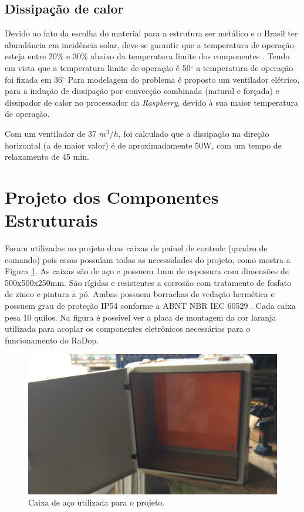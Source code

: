 \subsection{Dissipação de calor}

Devido ao fato da escolha do material para a estrutura ser metálico e o Brasil ter abundância em incidência solar, deve-se garantir que a temperatura de operação esteja entre 20\% e 30\% abaixo da temperatura limite dos componentes \cite{dissipacao}. Tendo em vista que a temperatura limite de operação é 50$^{\circ}$ a temperatura de operação foi fixada em 36$^{\circ}$ Para modelagem do problema é proposto um ventilador elétrico, para a indução de dissipação por convecção combinada (natural e forçada) \cite{transcal} e dissipador de calor no processador da \textit{Raspberry}, devido à sua maior temperatura de operação.

Com um ventilador de 37 $m^3/h$, foi calculado que a dissipação na direção horizontal (a de maior valor) é de aproximadamente 50W, com um tempo de relaxamento de 45 min.

\section{Projeto dos Componentes Estruturais}

Foram utilizadas no projeto duas caixas de painel de controle (quadro de comando) pois essas possuíam todas as necessidades do projeto, como mostra a Figura \ref{caixa}. As caixas são de aço e possuem 1mm de espessura com dimensões de 500x500x250mm. São rígidas e resistentes a corrosão com tratamento de fosfato de zinco e pintura a pó. Ambas possuem borrachas de vedação hermética e possuem grau de proteção IP54 conforme a ABNT NBR IEC 60529 \cite{involucro}. Cada caixa pesa 10 quilos. Na figura é possível ver a placa de montagem da cor laranja utilizada para acoplar os componentes eletrônicos necessários para o funcionamento do RaDop.

\begin{figure}[H]
	\centering
    \includegraphics[keepaspectratio=true,scale=0.315]{figuras/caixa.jpg}
    \caption{Caixa de aço utilizada para o projeto.}
    \label{caixa}
\end{figure}

